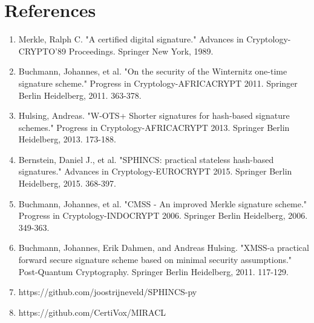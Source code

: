 \documentclass[]{scrartcl}
\begin{document}
\section*{References}
\begin{enumerate}
\item Merkle, Ralph C. "A certified digital signature." Advances in Cryptology-CRYPTO'89 Proceedings. Springer New York, 1989.
\item Buchmann, Johannes, et al. "On the security of the Winternitz one-time signature scheme." Progress in Cryptology-AFRICACRYPT 2011. Springer Berlin Heidelberg, 2011. 363-378.
\item Hulsing, Andreas. "W-OTS+ Shorter signatures for hash-based signature schemes." Progress in Cryptology-AFRICACRYPT 2013. Springer Berlin Heidelberg, 2013. 173-188.
\item Bernstein, Daniel J., et al. "SPHINCS: practical stateless hash-based signatures." Advances in Cryptology-EUROCRYPT 2015. Springer Berlin Heidelberg, 2015. 368-397.
\item Buchmann, Johannes, et al. "CMSS - An improved Merkle signature scheme." Progress in Cryptology-INDOCRYPT 2006. Springer Berlin Heidelberg, 2006. 349-363.
\item Buchmann, Johannes, Erik Dahmen, and Andreas Hulsing. "XMSS-a practical forward secure signature scheme based on minimal security assumptions." Post-Quantum Cryptography. Springer Berlin Heidelberg, 2011. 117-129.
\item https://github.com/joostrijneveld/SPHINCS-py
\item https://github.com/CertiVox/MIRACL
\end{enumerate}
\end{document}
